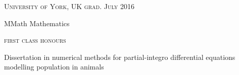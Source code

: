 {\raggedright
  \textsc{\small{University of York, UK
    \hfill
    {\raggedleft
      grad. July 2016
    }
  }}

  {\raggedright\large {
    MMath Mathematics
  } \\}

  \textsc{\small{first class honours}}

  \normalsize{
    Dissertation in numerical methods for partial-integro differential equations modelling population in animals
  }

  \vspace{8pt}
}
